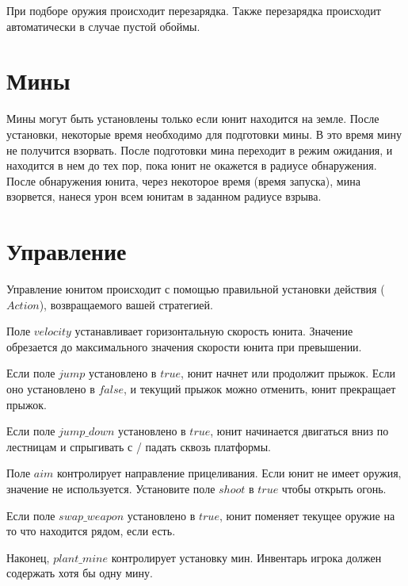 При подборе оружия происходит перезарядка.
Также перезарядка происходит автоматически в случае пустой обоймы.

\section{Мины}

Мины могут быть установлены только если юнит находится на земле.
После установки, некоторые время необходимо для подготовки мины. В это время мину не получится взорвать.
После подготовки мина переходит в режим ожидания, и находится в нем до тех пор,
пока юнит не окажется в радиусе обнаружения.
После обнаружения юнита, через некоторое время (время запуска), мина взорвется, нанеся урон всем юнитам в заданном радиусе взрыва.

\section{Управление}

Управление юнитом происходит с помощью правильной установки действия ($Action$), возвращаемого вашей стратегией.

Поле $velocity$ устанавливает горизонтальную скорость юнита. Значение обрезается до максимального значения скорости юнита при превышении.

Если поле $jump$ установлено в $true$, юнит начнет или продолжит прыжок.
Если оно установлено в $false$, и текущий прыжок можно отменить, юнит прекращает прыжок.

Если поле $jump\_down$ установлено в $true$, юнит начинается двигаться вниз по лестницам и спрыгивать с / падать сквозь платформы.

Поле $aim$ контролирует направление прицеливания. Если юнит не имеет оружия, значение не используется.
Установите поле $shoot$ в $true$ чтобы открыть огонь.

Если поле $swap\_weapon$ установлено в $true$, юнит поменяет текущее оружие на то что находится рядом, если есть.

Наконец, $plant\_mine$ контролирует установку мин. Инвентарь игрока должен содержать хотя бы одну мину.